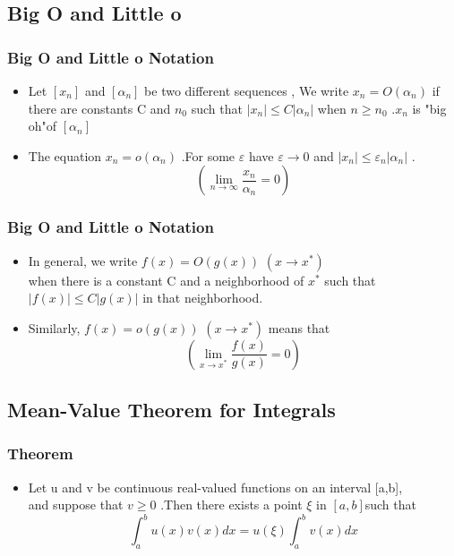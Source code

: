 \documentclass[notheorems,mathserif,table,compress]{beamer}  %
\begin{document}
\subsection{Big O and Little o }
\begin{frame}
  \frametitle{Big O and Little o Notation}
  \begin{itemize}
  \item Let $[x_n]$ and $[\alpha_n]$ be two different  sequences , We write $x_n=O(\alpha_n)$
 if there are constants C and $n_0$ such that $|x_n| \leq C|\alpha_n|$ when $n\geq n_0$ .$x_n$ is "big oh"of $[\alpha_n]$   
\newline

  \item  The  equation $x_n=o(\alpha_n)$ .For some $\varepsilon$ have   $\varepsilon \rightarrow 0$ and $|x_n|\leq \varepsilon_n|\alpha_n|$ .   
   \begin{displaymath}
  (\lim_{n \to \infty}\frac{x_n}{\alpha_n}=0) 
  \end{displaymath} 
  \end{itemize}
\end{frame}

\begin{frame}
  \frametitle{Big O and Little o Notation}
  \begin{itemize}
  \item In  general, we write $f(x)=O(g(x))$  $(x\rightarrow x^*)$\\
  when  there  is a constant  C and a   neighborhood of $x^*$ such  that  $|f(x)|\leq C|g(x)|$ in that neighborhood.
\newline

 \item  Similarly, $f(x)=o(g(x))$ $(x\rightarrow x^*)$ means that 
\begin{displaymath}
 (\lim_{x \to x^*}\frac {f(x)}{g(x)}=0)
\end{displaymath} 
\end{itemize}
\end{frame}

\subsection{Mean-Value Theorem  for Integrals }
\begin{frame}
  \frametitle{Theorem}
  \begin{itemize}
 \item Let u and v be continuous real-valued functions on an interval [a,b],\\
and suppose  that $v \geq  0$ .Then  there  exists a point $\xi$ in $[a,b]$such that 
\begin{displaymath}
\int _{a}^{b} u(x)v(x)dx {=} u(\xi)\int_{a}^{b}v(x)dx
\end{displaymath} 
  \end{itemize}
\end{frame}
\end{document}

